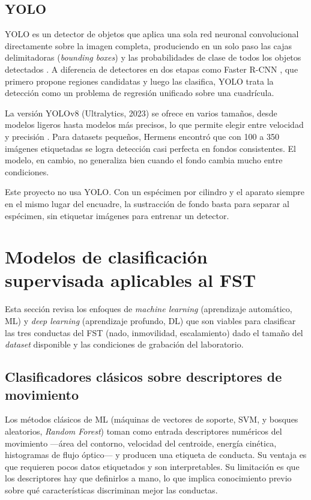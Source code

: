 \subsection{YOLO}

YOLO es un detector de objetos que aplica una sola red neuronal convolucional
directamente sobre la imagen completa, produciendo en un solo paso las cajas
delimitadoras (\textit{bounding boxes}) y las probabilidades de clase de todos los
objetos detectados \cite{redmon2016}. A diferencia de detectores en dos etapas como
Faster R-CNN \cite{ren2017}, que primero propone regiones candidatas y luego las clasifica, YOLO
trata la detección como un problema de regresión unificado sobre una cuadrícula.

La versión YOLOv8 (Ultralytics, 2023) se ofrece en varios tamaños, desde modelos ligeros
hasta modelos más precisos, lo que permite elegir entre velocidad y precisión
\cite{jocher2023}. Para datasets pequeños, Hermens \cite{hermens2024_yolov8}
encontró que con 100 a 350 imágenes etiquetadas se logra detección casi perfecta en
fondos consistentes. El modelo, en cambio, no generaliza bien cuando el fondo cambia
mucho entre condiciones.

Este proyecto no usa YOLO. Con un espécimen por cilindro y el aparato siempre en el
mismo lugar del encuadre, la sustracción de fondo basta para separar al espécimen, sin
etiquetar imágenes para entrenar un detector.

\section{Modelos de clasificación supervisada aplicables al FST}

Esta sección revisa los enfoques de \textit{machine learning} (aprendizaje automático, ML) y \textit{deep learning}
(aprendizaje profundo, DL) que son viables
para clasificar las tres conductas del FST (nado, inmovilidad, escalamiento) dado el
tamaño del \textit{dataset} disponible y las condiciones de grabación del laboratorio.

\subsection{Clasificadores clásicos sobre descriptores de movimiento}

Los métodos clásicos de ML (máquinas de vectores de soporte, SVM, y bosques aleatorios, \textit{Random Forest}) toman como entrada descriptores
numéricos del movimiento ---área del contorno, velocidad del centroide, energía cinética,
histogramas de flujo óptico--- y producen una etiqueta de conducta. Su ventaja es que
requieren pocos datos etiquetados y son interpretables. Su limitación es que los
descriptores hay que definirlos a mano, lo que implica conocimiento previo sobre qué
características discriminan mejor las conductas.

